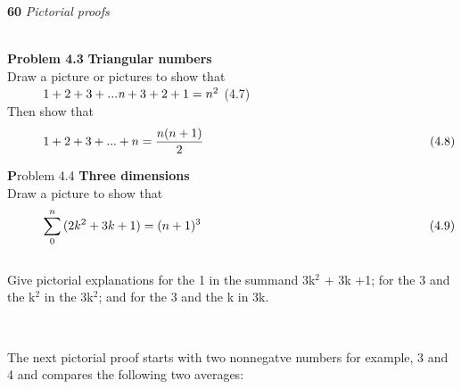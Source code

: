 \documentclass [a4paper]{article}
\begin{document}
\newpage
\pagestyle{fancy}
\begin{justify}
\Large{\textbf{60}}  \hspace{11.3cm} \large{\textit{Pictorial proofs}}\\
\vspace*{0.5mm}\\
\colorbox{light-gray}
{\begin{minipage}{\textwidth}
\begin{justify}
\vspace*{3mm}
\large\textbf{\hspace{5mm} Problem 4.3} \hspace*{5mm} \large\textbf{Triangular numbers}\\

\noindent \hspace{0.5cm} Draw a picture or pictures to show that\\

$\hspace*{1cm} 1+2+3+...\textit{n}+ 3+2+1= n^2$ \hspace*{6cm} (4.7)\\

\noindent \hspace*{0.5cm} Then show that\\
$$\hspace{1cm} 1+2+3+... +n=\frac{n(n+1)}{2} \hspace*{6.5cm} (4.8)$$ 

\large\textbf Problem 4.4 \hspace*{5mm} \large\textbf{Three dimensions}\\

Draw a picture to show that\\
$$\hspace*{1cm} \sum _{0}^{n}{(2k^2+3k+1)=(n+1)^3} \hspace*{6.5cm}(4.9)$$\\
\hspace*{5mm} Give pictorial explanations for the 1 in the summand 3k$^2$ + 3k +1; for the 3 and the \hspace*{0.5cm} k$^2$ in the 3k$^2$; and for the 3 and the k in 3k.
\vspace*{3mm}
\end{justify}
\end{minipage}}

\vspace*{1cm}
\\
\begin{justify}
\Large The next pictorial proof starts with two  nonnegatve numbers \textemdash for example, 3 and 4 \textemdash and compares the following two averages:\\


\end{justify}
\end{justify}
\end{document}
